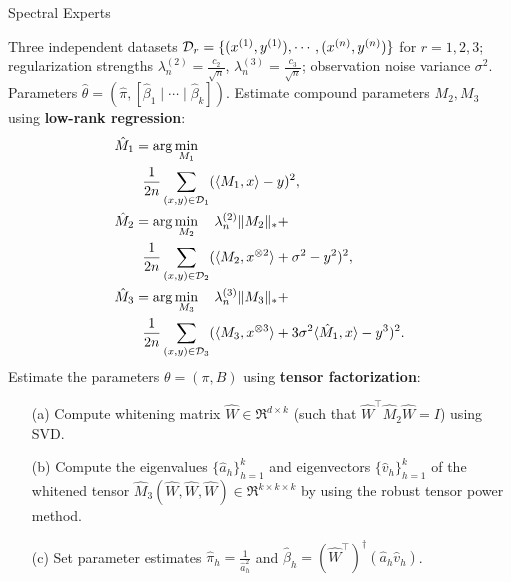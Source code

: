 \begin{algorithm}[t]
  \caption{Spectral Experts}
  \label{algo:spectral-experts}
  \begin{algorithmic}[1]
    \INPUT Three independent datasets $\mathcal{D}_r = \{ (x^{(1)}, y^{(1)}), \cdots, (x^{(n)}, y^{(n)}) \}$ for $r = 1, 2, 3$;
    regularization strengths $\lambda_n^{(2)} = \frac{c_2}{\sqrt{n}}$, $\lambda_n^{(3)} = \frac{c_3}{\sqrt{n}}$;
    observation noise variance $\sigma^2$.
    \OUTPUT Parameters $\hat\theta = (\hat \pi, [\hat \beta_1 \mid \cdots \mid \hat \beta_k])$.
    \STATE Estimate compound parameters $M_2, M_3$ using \textbf{low-rank regression}:
    \begin{align}
      &\hat M_1 = \arg\min_{M_1} \label{eqn:estimateM1} \\
      &\quad\quad\frac{1}{2n} \sum_{(x,y) \in \mathcal{D}_1} (\langle M_1, x \rangle - y)^2, \nonumber \\
      &\hat M_2 = \arg\min_{M_2} \quad \lambda_n^{(2)} \|M_2\|_* + \label{eqn:estimateM2} \\
      &\quad\quad\frac{1}{2n} \sum_{(x,y) \in \mathcal{D}_2} (\langle M_2, x^{\otimes 2} \rangle + \sigma^2 - y^2)^2, \nonumber \\
      &\hat M_3 = \arg\min_{M_3} \quad \lambda_n^{(3)} \|M_3\|_* + \label{eqn:estimateM3} \\
      &\quad\quad\frac{1}{2n} \sum_{(x,y) \in \mathcal{D}_3} (\langle M_3, x^{\otimes 3} \rangle + 3 \sigma^2\langle \hat M_1, x \rangle - y^3)^2. \nonumber
    \end{align}
    \STATE Estimate the parameters $\theta = (\pi, B)$ using \textbf{tensor factorization}:
    \begin{enumerate}
      \item [(a)] Compute whitening matrix $\hat W \in \Re^{d \times k}$ (such that $\hat W^\top
      \hat M_2 \hat W = I$) using SVD.
      \item [(b)] Compute the eigenvalues $\{\hat a_h\}_{h=1}^k$
      and eigenvectors $\{\hat v_h\}_{h=1}^k$
      of the whitened tensor $\hat M_3(\hat W, \hat W, \hat W) \in \Re^{k \times k \times k}$
      by using the robust tensor power method.
    \item [(c)] Set parameter estimates $\hat\pi_h = \frac{1}{\hat a_h^2}$
    and $\hat\beta_h = (\hat W^{\top})^\dagger (\hat a_h \hat v_h)$.
    \end{enumerate}
  \end{algorithmic}
\end{algorithm}

